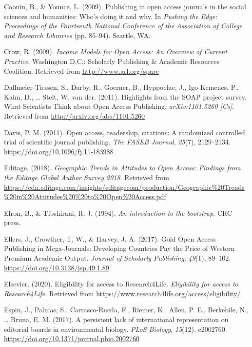 \documentclass[
  english,
  man]{apa6}
\begin{document}
\leavevmode\hypertarget{ref-coonin_publishing_2009}{}%
Coonin, B., \& Younce, L. (2009). Publishing in open access journals in the social sciences and humanities: Who's doing it and why. In \emph{Pushing the Edge: Proceedings of the Fourteenth National Conference of the Association of College and Research Libraries} (pp. 85--94). Seattle, WA.

\leavevmode\hypertarget{ref-crow_income_2009}{}%
Crow, R. (2009). \emph{Income Models for Open Access: An Overview of Current Practice}. Washington D.C.: Scholarly Publishing \& Academic Resources Coalition. Retrieved from \url{http://www.arl.org/sparc}

\leavevmode\hypertarget{ref-dallmeier-tiessen_highlights_2011}{}%
Dallmeier-Tiessen, S., Darby, R., Goerner, B., Hyppoelae, J., Igo-Kemenes, P., Kahn, D., \ldots{} Stelt, W. van der. (2011). Highlights from the SOAP project survey. What Scientists Think about Open Access Publishing. \emph{arXiv:1101.5260 {[}Cs{]}}. Retrieved from \url{http://arxiv.org/abs/1101.5260}

\leavevmode\hypertarget{ref-davis_open_2011}{}%
Davis, P. M. (2011). Open access, readership, citations: A randomized controlled trial of scientific journal publishing. \emph{The FASEB Journal}, \emph{25}(7), 2129--2134. \url{https://doi.org/10.1096/fj.11-183988}

\leavevmode\hypertarget{ref-editage_geographic_2018}{}%
Editage. (2018). \emph{Geographic Trends in Attitudes to Open Access: Findings from the Editage Global Author Survey 2018}. Retrieved from \url{https://cdn.editage.com/insights/editagecom/production/Geographic\%20Trends\%20in\%20Attitudes\%20\%20to\%20Open\%20Access.pdf}

\leavevmode\hypertarget{ref-efron_introduction_1994}{}%
Efron, B., \& Tibshirani, R. J. (1994). \emph{An introduction to the bootstrap}. CRC press.

\leavevmode\hypertarget{ref-ellers_gold_2017}{}%
Ellers, J., Crowther, T. W., \& Harvey, J. A. (2017). Gold Open Access Publishing in Mega-Journals: Developing Countries Pay the Price of Western Premium Academic Output. \emph{Journal of Scholarly Publishing}, \emph{49}(1), 89--102. \url{https://doi.org/10.3138/jsp.49.1.89}

\leavevmode\hypertarget{ref-elsevier_eligibility_2020}{}%
Elsevier. (2020). Eligibility for access to Research4Life. \emph{Eligibility for access to Research4Life}. Retrieved from \url{https://www.research4life.org/access/eligibility/}

\leavevmode\hypertarget{ref-espin_persistent_2017}{}%
Espin, J., Palmas, S., Carrasco-Rueda, F., Riemer, K., Allen, P. E., Berkebile, N., \ldots{} Bruna, E. M. (2017). A persistent lack of international representation on editorial boards in environmental biology. \emph{PLoS Biology}, \emph{15}(12), e2002760. \url{https://doi.org/10.1371/journal.pbio.2002760}
\end{document}
